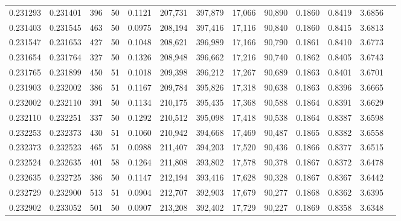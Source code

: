 \begin{tabular}{rrrrrrrrrrrrr}
0.231293 & 0.231401 &   396 &  50 &                                     0.1121 & 207,731 & 397,879 &  17,066 &  90,890 & 0.1860 & 0.8419 & 3.6856 \\
0.231403 & 0.231545 &   463 &  50 &                                     0.0975 & 208,194 & 397,416 &  17,116 &  90,840 & 0.1860 & 0.8415 & 3.6813 \\
0.231547 & 0.231653 &   427 &  50 &                                     0.1048 & 208,621 & 396,989 &  17,166 &  90,790 & 0.1861 & 0.8410 & 3.6773 \\
0.231654 & 0.231764 &   327 &  50 &                                     0.1326 & 208,948 & 396,662 &  17,216 &  90,740 & 0.1862 & 0.8405 & 3.6743 \\
0.231765 & 0.231899 &   450 &  51 &                                     0.1018 & 209,398 & 396,212 &  17,267 &  90,689 & 0.1863 & 0.8401 & 3.6701 \\
0.231903 & 0.232002 &   386 &  51 &                                     0.1167 & 209,784 & 395,826 &  17,318 &  90,638 & 0.1863 & 0.8396 & 3.6665 \\
0.232002 & 0.232110 &   391 &  50 &                                     0.1134 & 210,175 & 395,435 &  17,368 &  90,588 & 0.1864 & 0.8391 & 3.6629 \\
0.232110 & 0.232251 &   337 &  50 &                                     0.1292 & 210,512 & 395,098 &  17,418 &  90,538 & 0.1864 & 0.8387 & 3.6598 \\
0.232253 & 0.232373 &   430 &  51 &                                     0.1060 & 210,942 & 394,668 &  17,469 &  90,487 & 0.1865 & 0.8382 & 3.6558 \\
0.232373 & 0.232523 &   465 &  51 &                                     0.0988 & 211,407 & 394,203 &  17,520 &  90,436 & 0.1866 & 0.8377 & 3.6515 \\
0.232524 & 0.232635 &   401 &  58 &                                     0.1264 & 211,808 & 393,802 &  17,578 &  90,378 & 0.1867 & 0.8372 & 3.6478 \\
0.232635 & 0.232725 &   386 &  50 &                                     0.1147 & 212,194 & 393,416 &  17,628 &  90,328 & 0.1867 & 0.8367 & 3.6442 \\
0.232729 & 0.232900 &   513 &  51 &                                     0.0904 & 212,707 & 392,903 &  17,679 &  90,277 & 0.1868 & 0.8362 & 3.6395 \\
0.232902 & 0.233052 &   501 &  50 &                                     0.0907 & 213,208 & 392,402 &  17,729 &  90,227 & 0.1869 & 0.8358 & 3.6348 \\

\end{tabular}
